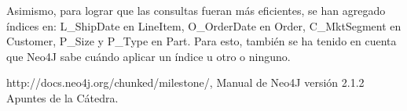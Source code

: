 \documentclass[10pt,journal,compsoc]{IEEEtran}
\begin{document}
Asimismo, para lograr que las consultas fueran m\'as eficientes, se han agregado \'indices en: L\_ShipDate en LineItem, O\_OrderDate en Order, C\_MktSegment en Customer, P\_Size y P\_Type en Part. Para esto, tambi\'en se ha tenido en cuenta que Neo4J sabe cu\'ando aplicar un \'indice u otro o ninguno. 
\renewcommand{\refname}{Bibliograf\'ia}
\begin{thebibliography}{1}
 http://docs.neo4j.org/chunked/milestone/, Manual de Neo4J versi\'on 2.1.2
 Apuntes de la C\'atedra.

\end{thebibliography}
\end{document}
